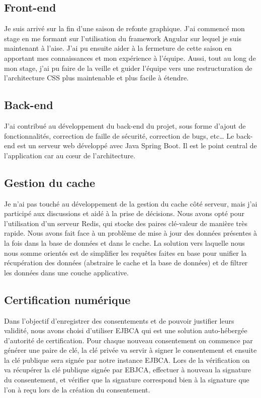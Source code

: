 \documentclass[12pt, a4paper]{report}
\newcommand\tab[1][1cm]{\hspace*{#1}}
\begin{document}
            \subsection{Front-end}
                \tab{} Je suis arrivé sur la fin d'une saison de refonte graphique.
                J'ai commencé mon stage en me formant sur l'utilisation du framework Angular sur lequel je suis maintenant à l'aise.
                J'ai pu ensuite aider à la fermeture de cette saison en apportant mes connaissances et mon expérience à l'équipe.\newline
                Aussi, tout au long de mon stage, j'ai pu faire de la veille et guider l'équipe vers une restructuration de l'architecture CSS plus maintenable et plus facile à étendre.
            \subsection{Back-end}
                J'ai contribué au développement du back-end du projet, sous forme d'ajout de fonctionnalités, correction de faille de sécurité, correction de bugs, etc\ldots\newline
                Le back-end est un serveur web développé avec Java Spring Boot. Il est le point central de l'application car au cœur de l'architecture.
            \subsection{Gestion du cache}
                Je n'ai pas touché au développement de la gestion du cache côté serveur, mais j'ai participé aux discussions et aidé à la prise de décisions.
                Nous avons opté pour l'utilisation d'un serveur Redis, qui stocke des paires clé-valeur de manière très rapide.\newline
                Nous avons fait face à un problème de mise à jour des données présentes à la fois dans la base de données et dans le cache. La solution vers laquelle nous nous somme orientés est de simplifier les requêtes faites en base pour unifier la récupération des données (abstraire le cache et la base de données) et de filtrer les données dans une couche applicative.
            \subsection{Certification numérique}
                Dans l'objectif d'enregistrer des consentements et de pouvoir justifier leurs validité, nous avons choisi d'utiliser EJBCA qui est une solution auto-hébergée d'autorité de certification.\newline
                Pour chaque nouveau consentement on commence par générer une paire de clé, la clé privée va servir à signer le consentement et ensuite la clé publique sera signée par notre instance EJBCA.\newline
                Lors de la vérification on va récupérer la clé publique signée par EBJCA, effectuer à nouveau la signature du consentement, et vérifier que la signature correspond bien à la signature que l'on à reçu lors de la création du consentement.\newline
\end{document}

